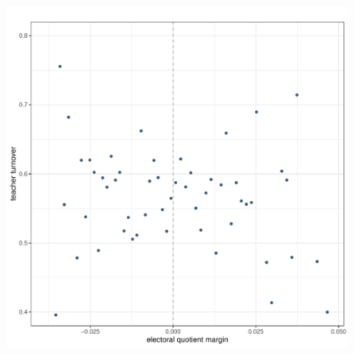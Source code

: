 \documentclass[12pt,a4paper]{article}
\newcommand{\blue}{\textcolor{blue}}
\begin{document}
\begin{figure}[h]
    \centering
    \includegraphics{plots/visual_rdd_legislative_seat_flip.pdf}
\end{figure}




\end{document}
